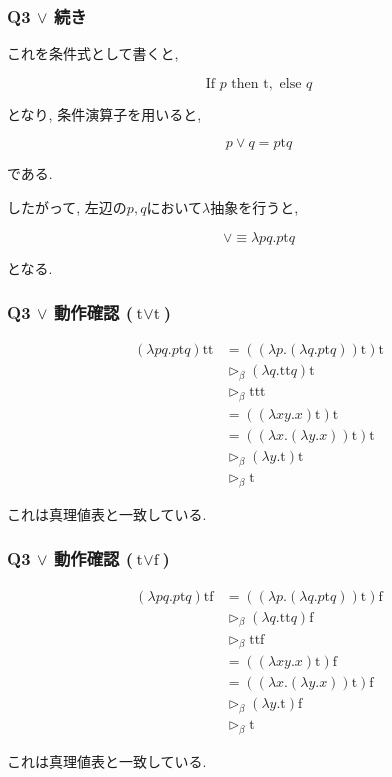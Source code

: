 \begin{frame}[fragile]

\frametitle{Q3 $\lor$ 続き}

これを条件式として書くと, 

\[
\text{If }p\text{ then }\text{t},
\text{ else }q
\]

となり, 条件演算子を用いると, 

\[
p\lor q
=
p\text{t}q
\]

である.

したがって, 左辺の$p, q$において$\lambda$抽象を行うと, 

\[
\boxed{
\lor
\equiv
\lambda pq.p\text{t}q
}
\]

となる.

\end{frame}

\begin{frame}[fragile]

\frametitle{Q3 $\lor$ 動作確認 ($\text{t}\lor \text{t}$)}

\begin{align*}
(\lambda pq.p\mathrm{t}q)\mathrm{tt}
&=
((\lambda p.(\lambda q.p\mathrm{t}q))
\mathrm{t})\mathrm{t}
\\
&\triangleright_{\beta}
(\lambda q.\mathrm{tt}q)\mathrm{t}
\\
&\triangleright_{\beta}
\mathrm{ttt}
\\
&=
((\lambda xy.x)\mathrm{t})\mathrm{t}
\\
&=
((\lambda x.(\lambda y.x))
\mathrm{t})\mathrm{t}
\\
&\triangleright_{\beta}
(\lambda y.\mathrm{t})\mathrm{t}
\\
&\triangleright_{\beta}
\mathrm{t}
\end{align*}

これは真理値表と一致している.

\end{frame}

\begin{frame}[fragile]

\frametitle{Q3 $\lor$ 動作確認 ($\text{t}\lor \text{f}$)}

\begin{align*}
(\lambda pq.p\mathrm{t}q)\mathrm{tf}
&=
((\lambda p.(\lambda q.p\mathrm{t}q))
\mathrm{t})\mathrm{f}
\\
&\triangleright_{\beta}
(\lambda q.\mathrm{tt}q)\mathrm{f}
\\
&\triangleright_{\beta}
\mathrm{ttf}
\\
&=
((\lambda xy.x)\mathrm{t})\mathrm{f}
\\
&=
((\lambda x.(\lambda y.x))
\mathrm{t})\mathrm{f}
\\
&\triangleright_{\beta}
(\lambda y.\mathrm{t})\mathrm{f}
\\
&\triangleright_{\beta}
\mathrm{t}
\end{align*}

これは真理値表と一致している.

\end{frame}

